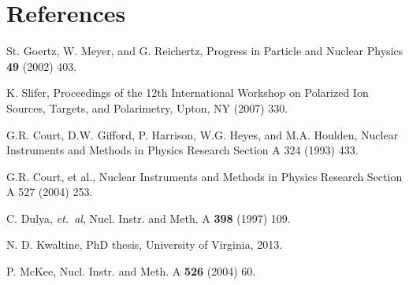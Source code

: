 \documentclass[preprint,12pt]{elsarticle}
\begin{document}



\section{References}
\begin{thebibliography}{00}

 St. Goertz, W. Meyer, and G. Reichertz, Progress in Particle and Nuclear Physics {\bf 49} (2002) 403.

 K. Slifer, Proceedings of the 12th International Workshop on Polarized Ion Sources, Targets,
and Polarimetry, Upton, NY (2007) 330.




 G.R. Court, D.W. Gifford, P. Harrison, W.G. Heyes, and M.A. Houlden, 
Nuclear Instruments and Methods in Physics Research Section A 324 (1993) 433.

 G.R. Court, et al., 
Nuclear Instruments and Methods in Physics Research Section A 527 (2004) 253.

  C. Dulya, {\em et.~al\/}, Nucl. Instr. and Meth. A \textbf{398} (1997) 109.

 N. D. Kwaltine, PhD thesis, University of Virginia, 2013.

 P. McKee, Nucl. Instr. and Meth. A \textbf{526} (2004) 60.
\end{thebibliography}
\end{document}

